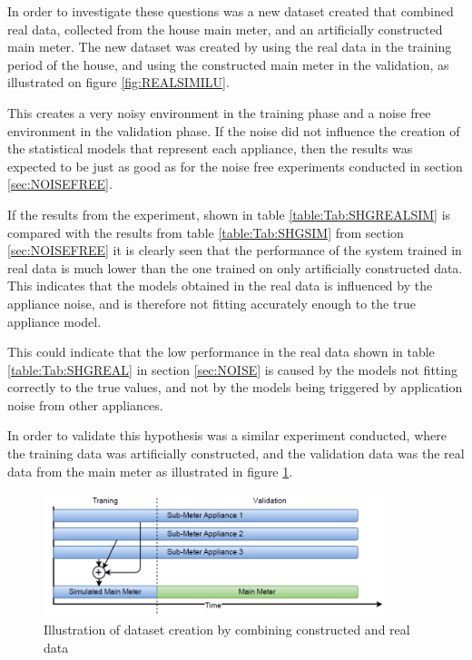 In order to investigate these questions was a new dataset created that combined real data, collected from the house main meter, and an artificially constructed main meter. The new dataset was created by using the real data in the training period of the house, and using the constructed main meter in the validation, as illustrated on figure \ref{fig:REALSIMILU}.

This creates a very noisy environment in the training phase and a noise free environment in the validation phase. If the noise did not influence the creation of the statistical models that represent each appliance, then the results was expected to be just as good as for the noise free experiments conducted in section \ref{sec:NOISEFREE}.




If the results from the experiment, shown in table \ref{table:Tab:SHGREALSIM} is compared with the results from table \ref{table:Tab:SHGSIM} from section \ref{sec:NOISEFREE} it is clearly seen that the performance of the system trained in real data is much lower than the one trained on only artificially constructed data. This indicates that the models obtained in the real data is influenced by the appliance noise, and is therefore not fitting accurately enough to the true appliance model. 

This could indicate that the low performance in the real data shown in table \ref{table:Tab:SHGREAL} in section \ref{sec:NOISE} is caused by the models not fitting correctly to the true values, and not by the models being triggered by application noise from other appliances.

In order to validate this hypothesis was a similar experiment conducted, where the training data was artificially constructed, and the validation data was the real data from the main meter as illustrated in figure \ref{fig:SHGSIMREAL}. 

\begin{figure}[H]
\centering
\includegraphics[width=0.9\textwidth]{billeder/SIMREAL.png}
\caption{Illustration of dataset creation by combining constructed and real data}
\label{fig:SHGSIMREAL}
\end{figure}

